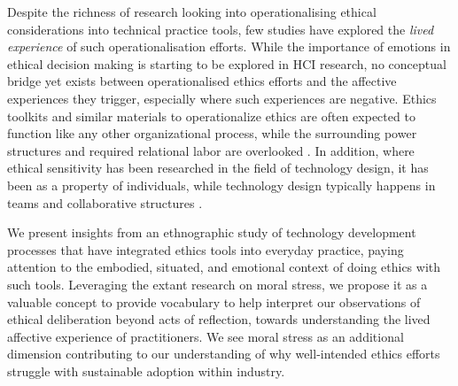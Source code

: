 Despite the richness of research looking into operationalising ethical considerations into technical practice tools, few studies have explored the \textit{lived experience} of such operationalisation efforts. While the importance of emotions in ethical decision making is starting to be explored in HCI research, no conceptual bridge yet exists between operationalised ethics efforts and the affective experiences they trigger, especially where such experiences are negative. Ethics toolkits and similar materials to operationalize ethics are often expected to function like any other organizational process, while the surrounding power structures and required relational labor are overlooked \cite{wong2023seeing}. In addition, where ethical sensitivity has been researched in the field of technology design, it has been as a property of individuals, while technology design typically happens in teams and collaborative structures \cite{boyd2021adapting}. 

We present insights from an ethnographic study of technology development processes that have integrated ethics tools into everyday practice, paying attention to the embodied, situated, and emotional context of doing ethics with such tools. Leveraging the extant research on moral stress, we propose it as a valuable concept to provide vocabulary to help interpret our observations of ethical deliberation beyond acts of reflection, towards understanding the lived affective experience of practitioners. We see moral stress as an additional dimension contributing to our understanding of why well-intended ethics efforts struggle with sustainable adoption within industry.